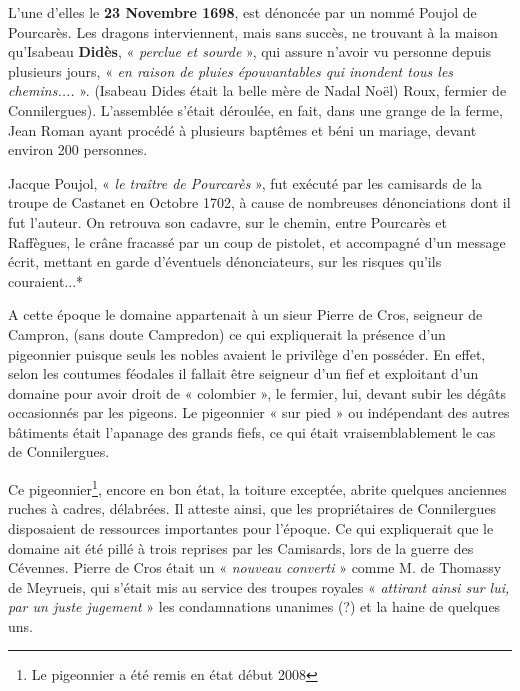 L’une d’elles le \textbf{23 Novembre 1698}, est dénoncée par un nommé Poujol de Pourcarès. Les
dragons interviennent, mais sans succès, ne trouvant à la maison qu’Isabeau \textbf{Didès}, « \textit{perclue
et sourde} », qui assure n’avoir vu personne depuis plusieurs jours, « \textit{en raison de pluies
épouvantables qui inondent tous les chemins....} ». (Isabeau Dides était la belle mère de Nadal
Noël) Roux, fermier de Connilergues).
L’assemblée s’était déroulée, en fait, dans une grange de la ferme, Jean Roman ayant procédé
à plusieurs baptêmes et béni un mariage, devant environ 200 personnes.

\vspace{0.2cm}

Jacque Poujol, « \textit{le traître de Pourcarès} », fut exécuté par les camisards de la troupe de
Castanet en Octobre 1702, à cause de nombreuses dénonciations dont il fut l’auteur. On
retrouva son cadavre, sur le chemin, entre Pourcarès et Raffègues, le crâne fracassé par un
coup de pistolet, et accompagné d’un message écrit, mettant en garde d’éventuels
dénonciateurs, sur les risques qu’ils couraient...*

A cette époque le domaine appartenait à un sieur Pierre de Cros, seigneur de Campron, (sans
doute Campredon) ce qui expliquerait la présence d’un pigeonnier puisque seuls les nobles
avaient le privilège d’en posséder. En effet, selon les coutumes féodales il fallait être seigneur
d’un fief et exploitant d’un domaine pour avoir droit de « colombier », le fermier, lui, devant
subir les dégâts occasionnés par les pigeons. Le pigeonnier « sur pied » ou indépendant des
autres bâtiments était l’apanage des grands fiefs, ce qui était vraisemblablement le cas de
Connilergues.

\vspace{0.2cm}

Ce pigeonnier\footnote{Le pigeonnier a été remis en état début 2008}, encore en bon état, la toiture exceptée, abrite quelques anciennes ruches à
cadres, délabrées. Il atteste ainsi, que les propriétaires de Connilergues disposaient de
ressources importantes pour l’époque. Ce qui expliquerait que le domaine ait été pillé à trois
reprises par les Camisards, lors de la guerre des Cévennes. Pierre de Cros était un « \textit{nouveau
converti} » comme M. de Thomassy de Meyrueis, qui s’était mis au service des troupes royales
« \textit{attirant ainsi sur lui, par un juste jugement} » les condamnations unanimes (?) et la haine de
quelques uns.

\vspace{0.2cm}

